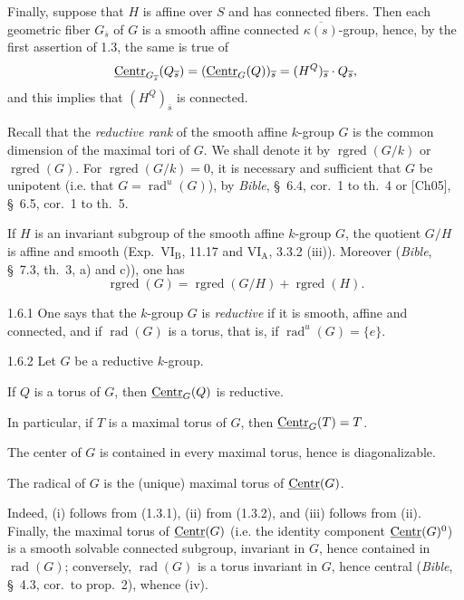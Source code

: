 Finally, suppose that $H$ is affine over $S$ and has connected fibers. Then each geometric fiber $G_{\overline{s}}$ of $G$ is a smooth affine connected $\overline{\kappa(s)}$-group, hence, by the first assertion of 1.3, the same is true of
\[
\underline{\mathrm{Centr}}_{G_{\overline{s}}}(Q_{\overline{s}})=(\underline{\mathrm{Centr}}_G(Q))_{\overline{s}}=(H^Q)_{\overline{s}}\cdot Q_{\overline{s}},
\]
and this implies that $(H^Q)_{\overline{s}}$ is connected.

 Recall that the \emph{reductive rank} of the smooth affine $k$-group $G$ is the common dimension of the maximal tori of $G$. We shall denote it by $\operatorname{rgred}(G/k)$ or $\operatorname{rgred}(G)$. For $\operatorname{rgred}(G/k)=0$, it is necessary and sufficient that $G$ be unipotent (i.e. that $G=\operatorname{rad}^{u}(G)$), by \textit{Bible}, \S~6.4, cor.~1 to th.~4 or [Ch05], \S~6.5, cor.~1 to th.~5.

If $H$ is an invariant subgroup of the smooth affine $k$-group $G$, the quotient $G/H$ is affine and smooth (Exp.~VI$_{\mathrm B}$, 11.17 and VI$_{\mathrm A}$, 3.3.2 (iii)). Moreover (\textit{Bible}, \S~7.3, th.~3, a) and c)), one has
\[
\operatorname{rgred}(G)=\operatorname{rgred}(G/H)+\operatorname{rgred}(H).
\]

\begin{definition}{1.6.1}\label{XIX.1.6.1}
{\renewcommand{\thefootnote}{(7)}}%
One says that the $k$-group $G$ is \emph{reductive} if it is smooth, affine and connected, and if $\operatorname{rad}(G)$ is a torus, that is, if $\operatorname{rad}^{u}(G)=\{e\}$.
\end{definition}
\begin{lemma}{1.6.2}\label{XIX.1.6.2}
Let $G$ be a reductive $k$-group.
\begin{enumeratei}
\item If $Q$ is a torus of $G$, then $\underline{\mathrm{Centr}}_G(Q)$ is reductive.
\item In particular, if $T$ is a maximal torus of $G$, then $\underline{\mathrm{Centr}}_G(T)=T$.
\item The center of $G$ is contained in every maximal torus, hence is diagonalizable.
\item The radical of $G$ is the (unique) maximal torus of $\underline{\mathrm{Centr}}(G)$.
\end{enumeratei}
\end{lemma}
Indeed, (i) follows from (1.3.1), (ii) from (1.3.2), and (iii) follows from (ii). Finally, the maximal torus of $\underline{\mathrm{Centr}}(G)$ (i.e. the identity component $\underline{\mathrm{Centr}}(G)^0$) is a smooth solvable connected subgroup, invariant in $G$, hence contained in $\operatorname{rad}(G)$; conversely, $\operatorname{rad}(G)$ is a torus invariant in $G$, hence central (\textit{Bible}, \S~4.3, cor.~to prop.~2), whence (iv).

